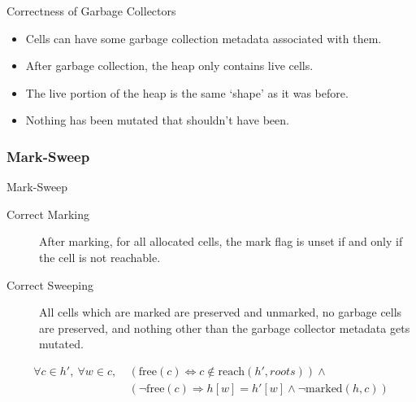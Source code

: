 \documentclass[usenames,dvipsnames]{beamer}
\renewcommand{\iff}{\Leftrightarrow}
\renewcommand{\implies}{\Rightarrow}
\newcommand{\reach}[2]{\mathrm{reach}\left(#1, #2\right)}
\newcommand{\free}[1]{\mathrm{free}\left(#1\right)}
\newcommand{\marked}[2]{\mathrm{marked}\left(#1, #2\right)}
\begin{document}
\begin{frame}{Correctness of Garbage Collectors}
  \begin{itemize}
  \item Cells can have some garbage collection metadata associated
    with them.
  \item After garbage collection, the heap only contains live cells.
  \item The live portion of the heap is the same `shape' as it was
    before.
  \item Nothing has been mutated that shouldn't have been.
  \end{itemize}


\end{frame}

\subsubsection{Mark-Sweep}

\begin{frame}{Mark-Sweep}
  \begin{description}
  \item[Correct Marking] After marking, for all allocated cells, the
    mark flag is unset if and only if the cell is not
    reachable.

  \item[Correct Sweeping] All cells which are marked are preserved and
    unmarked, no garbage cells are preserved, and nothing other than
    the garbage collector metadata gets mutated.
  \end{description}

  \begin{align*}
    \forall c \in h',\ \forall w \in c,\ &(\free{c} \iff c \notin
    \reach{h'}{roots}) \land\\
    &(\lnot\free{c} \implies h[w] = h'[w] \land
    \lnot\marked{h}{c}) 
  \end{align*}



\end{frame}
\end{document}

